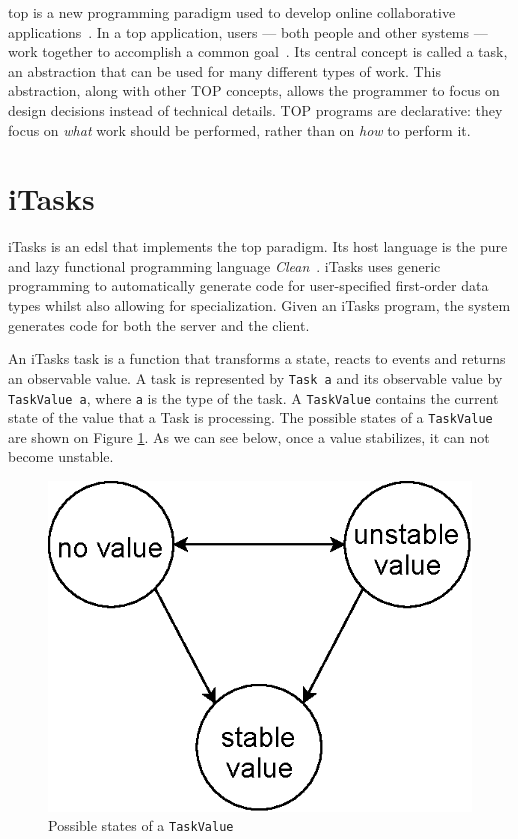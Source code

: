 \acf{top} is a new programming paradigm used to develop online collaborative applications~\cite{top}. In a \acs{top} application, users --- both people and other systems --- work together to accomplish a common goal~\cite{top}. Its central concept is called a task, an abstraction that can be used for many different types of work. This abstraction, along with other TOP concepts, allows the programmer to focus on design decisions instead of technical details. TOP programs are declarative: they focus on \textit{what} work should be performed, rather than on \textit{how} to perform it.

\section{iTasks}\label{itasks}
iTasks is an \acs{edsl} that implements the \acs{top} paradigm. Its host language is the pure and lazy functional programming language \textit{Clean}~\cite{clean}. iTasks uses generic programming to automatically generate code for user-specified first-order data types whilst also allowing for specialization. Given an iTasks program, the system generates code for both the server and the client.

An iTasks task is a function that transforms a state, reacts to events and returns an observable value. A task is represented by \texttt{Task a} and its observable value by \texttt{TaskValue a}, where \texttt{a} is the type of the task. A \texttt{TaskValue} contains the current state of the value that a Task is processing. The possible states of a \texttt{TaskValue} are shown on Figure \ref{fig:task_value}. As we can see below, once a value stabilizes, it can not become unstable.


\begin{figure}[H]
\begin{center}
\includegraphics[scale=0.7]{thesis/img/task_value.eps}
\end{center}
\caption{Possible states of a \texttt{TaskValue}}
\label{fig:task_value}
\end{figure}

